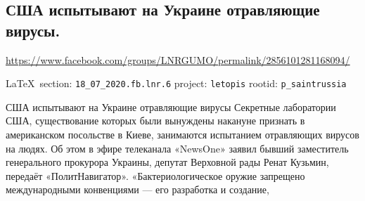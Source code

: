  
 
  
\subsection{США испытывают на Украине отравляющие вирусы.}
\label{sec:18_07_2020.fb.lnr.6}
\url{https://www.facebook.com/groups/LNRGUMO/permalink/2856101281168094/}

\vspace{0.5cm}
{\small\LaTeX~section: \verb|18_07_2020.fb.lnr.6| project: \verb|letopis| rootid: \verb|p_saintrussia|}
\vspace{0.5cm}

США испытывают на Украине отравляющие вирусы Секретные лаборатории США,
существование которых были вынуждены накануне признать в американском
посольстве в Киеве, занимаются испытанием отравляющих вирусов на людях. Об этом
в эфире телеканала «NewsOne» заявил бывший заместитель генерального прокурора
Украины, депутат Верховной рады Ренат Кузьмин, передаёт «ПолитНавигатор».
«Бактериологическое оружие запрещено международными конвенциями --- его
разработка и создание, 
